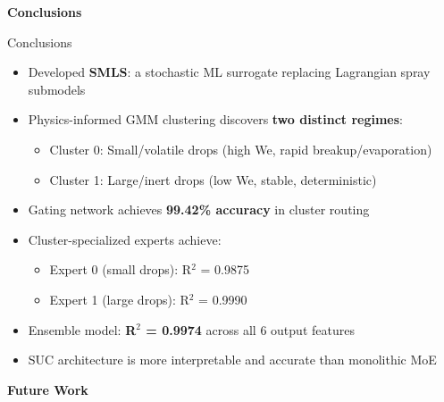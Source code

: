 \documentclass[aspectratio=169]{beamer}
\begin{document}
\begin{frame}{}
\vfill
\begin{center}
{\Huge\textbf{Conclusions}}
\end{center}
\vfill
\end{frame}

\begin{frame}{Conclusions}
\begin{itemize}[<+->]
    \item Developed \textbf{SMLS}: a stochastic ML surrogate replacing Lagrangian spray submodels
    \item Physics-informed GMM clustering discovers \textbf{two distinct regimes}:
    \begin{itemize}
        \item Cluster 0: Small/volatile drops (high We, rapid breakup/evaporation)
        \item Cluster 1: Large/inert drops (low We, stable, deterministic)
    \end{itemize}
    \item Gating network achieves \textbf{99.42\% accuracy} in cluster routing
    \item Cluster-specialized experts achieve:
    \begin{itemize}
        \item Expert 0 (small drops): R$^2$ = 0.9875
        \item Expert 1 (large drops): R$^2$ = 0.9990
    \end{itemize}
    \item Ensemble model: \textbf{R$^2$ = 0.9974} across all 6 output features
    \item SUC architecture is more interpretable and accurate than monolithic MoE
\end{itemize}
\end{frame}

\begin{frame}{}
\vfill
\begin{center}
{\Huge\textbf{Future Work}}
\end{center}
\vfill
\end{frame}
\end{document}
